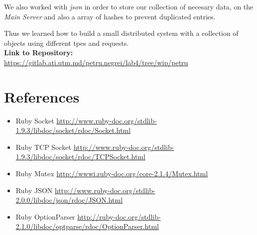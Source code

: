 \documentclass[12pt]{article}
\begin{document}
    We also worked with \textit{json} in order to store our collection of necesary data, on the \textit{Main Server} and also a array of hashes to prevent
    duplicated entries. 

    Thus we learned how to build a small distributed system with a collection of objects using different tpes and requests. \\

    \textbf{Link to Repository: } \url{https://gitlab.ati.utm.md/petru.negrei/lab4/tree/wip/petru}

   \section{References}

   \begin{itemize}
      \item Ruby Socket \url{http://www.ruby-doc.org/stdlib-1.9.3/libdoc/socket/rdoc/Socket.html}
      \item Ruby TCP  Socket \url{http://www.ruby-doc.org/stdlib-1.9.3/libdoc/socket/rdoc/TCPSocket.html}
      \item Ruby Mutex \url{http://wwwi.ruby-doc.org/core-2.1.4/Mutex.html}
      \item Ruby JSON \url{http://www.ruby-doc.org/stdlib-2.0.0/libdoc/json/rdoc/JSON.html}
      \item Ruby OptionParser \url{http://ruby-doc.org/stdlib-2.1.0/libdoc/optparse/rdoc/OptionParser.html}
   \end{itemize}
\end{document}
